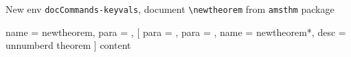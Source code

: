 \documentclass{article}
\begin{document}
\begin{example}{New env \Verb|docCommands-keyvals|, document \Verb|\newtheorem| from \Verb|amsthm| package}
  \begin{docCommands-keyvals}
    {
      name = newtheorem,
      para = ,
    }
    [
      para = ,
      para = ,
      {
        name = newtheorem*,
        desc = unnumberd theorem
      }
    ]
    content
  \end{docCommands-keyvals}
\end{example}
\end{document}
